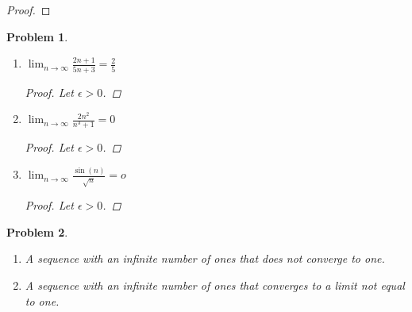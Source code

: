 \documentclass[12pt]{article}
\newtheorem{problem}{Problem}
\newcommand{\eps}{\ensuremath{\epsilon}}
\begin{document}
\begin{proof}
\end{proof}



\begin{problem} %
\begin{enumerate}
\item $\displaystyle \lim_{n\to\infty} \frac{2n+1}{5n+3} = \frac{2}{5}$

\begin{proof}
Let $\eps>0$.  %
\end{proof}

\item $\displaystyle \lim_{n\to\infty} \frac{2n^2}{n^3 + 1} = 0$

\begin{proof}
Let $\eps>0$.  %
\end{proof}

\item $\displaystyle \lim_{n\to\infty} \frac{\sin(n)}{\sqrt{n}} = o$

\begin{proof}
Let $\eps>0$.  %
\end{proof}
\end{enumerate}
\end{problem}



\begin{problem} %
\begin{enumerate}
\item A sequence with an infinite number of ones that does not converge to one.

\bigskip
\item A sequence with an infinite number of ones that converges to a limit not equal to one.

\bigskip
\end{enumerate}
\end{problem}
\end{document}
